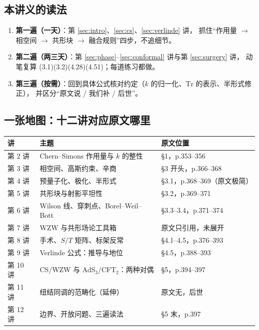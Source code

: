 \subsection{本讲义的读法}
\begin{enumerate}
  \item \textbf{第一遍（一天）}：第 \ref{sec:intro}、\ref{sec:cs}、\ref{sec:verlinde} 讲，
        抓住“作用量 $\to$ 相空间 $\to$ 共形块 $\to$ 融合规则”四步，不追细节。
  \item \textbf{第二遍（两三天）}：第 \ref{sec:phase}--\ref{sec:conformal} 讲与第 \ref{sec:surgery} 讲，
        动笔复算 (3.1)(3.2)(4.28)(4.51)；每道练习都做。
  \item \textbf{第三遍（按需）}：回到具体公式核对约定（$k$ 的归一化、$\mathrm{Tr}$ 的表示、半形式修正），
        并区分“原文说 / 我们补 / 后世”。
\end{enumerate}

\subsection{一张地图：十二讲对应原文哪里}
\begin{center}
\begin{tabular}{@{}lll@{}}
\toprule
讲 & 主题 & 原文位置 \\
\midrule
第 2 讲 & Chern--Simons 作用量与 $k$ 的整性 & \S1，p.353--356 \\
第 3 讲 & 相空间、高斯约束、辛商 & \S3 开头，p.366--368 \\
第 4 讲 & 预量子化、极化、半形式 & \S3.1，p.368--369（原文极简） \\
第 5 讲 & 共形块与射影平坦性 & \S3.2，p.369--371 \\
第 6 讲 & Wilson 线、穿刺点、Borel--Weil--Bott & \S3.3--3.4，p.371--374 \\
第 7 讲 & WZW 与共形场论工具箱 & 原文只引用，未展开 \\
第 8 讲 & 手术、$S/T$ 矩阵、标架反常 & \S4.1--4.5，p.376--393 \\
第 9 讲 & Verlinde 公式：推导与地位 & \S4.5，p.388--393 \\
第 10 讲 & CS/WZW 与 AdS$_3$/CFT$_2$：两种对偶 & \S5，p.394--397 \\
第 11 讲 & 纽结同调的范畴化（延伸） & 原文无，后世 \\
第 12 讲 & 边界、开放问题、三遍读法 & \S5 末，p.397 \\
\bottomrule
\end{tabular}
\end{center}

